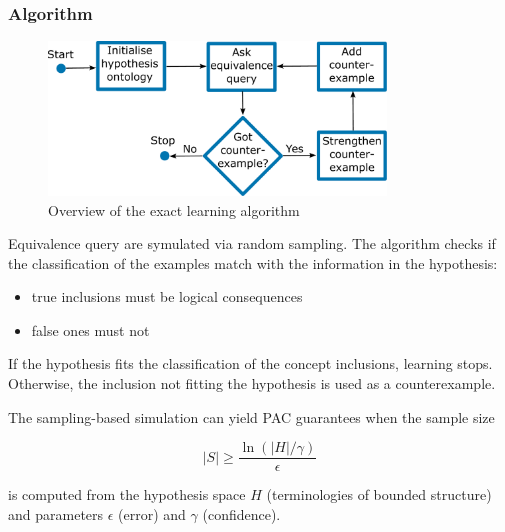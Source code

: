 \documentclass[handout]{beamer}\mode<handout>{\usetheme{AMSBolognaFC}}
\begin{document}
\begin{frame}[c, allowframebreaks]
\frametitle{Algorithm}

    \begin{figure}
        \centering
        \includegraphics[width=0.8\textwidth]{figures/algorithm}
        \caption{Overview of the exact learning algorithm}
        \label{fig:algorithm}
    \end{figure}

    \framebreak


    Equivalence query are \alert{symulated} via random \alert{sampling}.
    The algorithm checks if the classification of the examples match with the information in the hypothesis:

    \begin{itemize}
        \item true inclusions must be \alert{logical consequences}
        \item false ones must not
    \end{itemize}


    If the hypothesis fits the classification of the concept inclusions, learning stops.
    Otherwise, the inclusion not fitting the hypothesis is used as a \alert{counterexample}.


    \framebreak

    The sampling-based simulation can yield \alert{PAC}  guarantees when the sample size

    \begin{equation*}
        \lvert S \rvert \geq \frac{\ln\left(\lvert H \rvert / \gamma\right)}{\epsilon}
    \end{equation*}

    is computed from the hypothesis space $H$ (\EL terminologies of bounded structure) and parameters $\epsilon$ (error) and $\gamma$ (confidence).


\end{frame}
\end{document}
